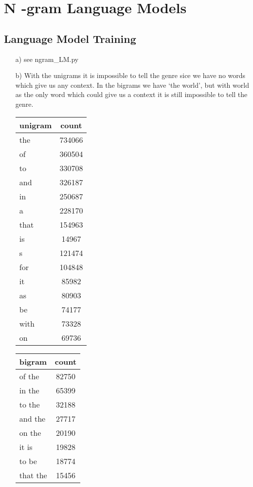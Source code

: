 \documentclass{article}
\begin{document}
\section{N -gram Language Models}
\subsection{Language Model Training}
\begin{itemize}
	\item[a)] see ngram\_LM.py
	\item[b)]
	With the unigrams it is impossible to tell the genre sice we have no words which give us any context. In the bigrams we have `the world', but with world as the only word which could give us a context it is still impossible to tell the genre.

	\begin{table}[h]
	\begin{tabular}{l|c}
		unigram & count\\\hline
		the & 734066 \\
		of &360504 \\
		to &330708 \\
		and &326187 \\
		in &250687 \\
		a &228170 \\
		that &154963 \\
		is &14967 \\
		s &121474 \\
		for &104848 \\
		it &85982 \\
		as &80903 \\
		be &74177 \\
		with &73328 \\
		on &69736 \\
	\end{tabular}
	\end{table}
	\begin{table}[h]
		\begin{tabular}{l|c}
		bigram & count \\\hline
		of the & 82750 \\
		in the & 65399 \\
		to the & 32188 \\
		and the & 27717 \\
		on the & 20190 \\
		it is & 19828 \\
		to be & 18774 \\
		that the & 15456 \\

\end{tabular}
\end{table}
\end{itemize}
\end{document}
